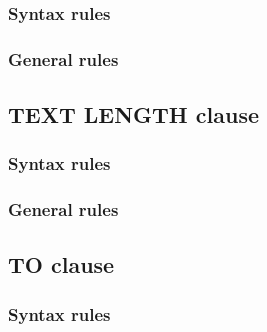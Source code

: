 \begin{syntax}
  \begin{1=}
     \\
     \\
  \end{1=}
  \begin{0-1}
     \\
  \end{0-1}
\end{syntax}

\subsubsection{Syntax rules}

\subsubsection{General rules}

\subsection{TEXT LENGTH clause}

\begin{syntax}[\deletedcolour]
\end{syntax}

\subsubsection{Syntax rules}

\subsubsection{General rules}

\subsection{TO clause}

\begin{syntax}
   \identifier
\end{syntax}

\subsubsection{Syntax rules}

